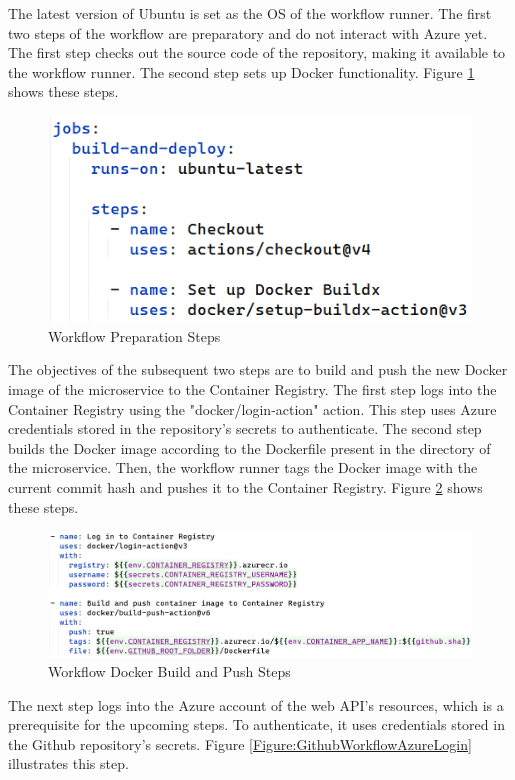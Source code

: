\documentclass[12pt, reqno]{amsbook}
\theoremstyle{definition}
\theoremstyle{definition}
\numberwithin{section}{chapter}
\numberwithin{table}{chapter}
\numberwithin{figure}{chapter}
\begin{document}
The latest version of Ubuntu is set as the \ac{OS} of the workflow runner. The first two steps of the workflow are preparatory and do not interact with Azure yet. The first step checks out the source code of the repository, making it available to the workflow runner. The second step sets up Docker functionality. Figure \ref{Figure:GithubWorkflowPreparation} shows these steps.

\begin{figure}[H]
  \centering
  \includegraphics[width=0.6\linewidth]{images/GithubWorkflowPreparation.png}
  \caption{\label{Figure:GithubWorkflowPreparation}Workflow Preparation Steps}
\end{figure}

The objectives of the subsequent two steps are to build and push the new Docker image of the microservice to the Container Registry. The first step logs into the Container Registry using the "docker/login-action" action. This step uses Azure credentials stored in the repository's secrets to authenticate. The second step builds the Docker image according to the Dockerfile present in the directory of the microservice. Then, the workflow runner tags the Docker image with the current commit hash and pushes it to the Container Registry. Figure \ref{Figure:GithubWorkflowContainerRegistry} shows these steps.

\begin{figure}[H]
  \centering
  \includegraphics[width=1\linewidth]{images/GithubWorkflowContainerRegistry.png}
  \caption{\label{Figure:GithubWorkflowContainerRegistry}Workflow Docker Build and Push Steps}
\end{figure}

The next step logs into the Azure account of the web \ac{API}'s resources, which is a prerequisite for the upcoming steps. To authenticate, it uses credentials stored in the Github repository's secrets. Figure \ref{Figure:GithubWorkflowAzureLogin} illustrates this step.
\end{document}
